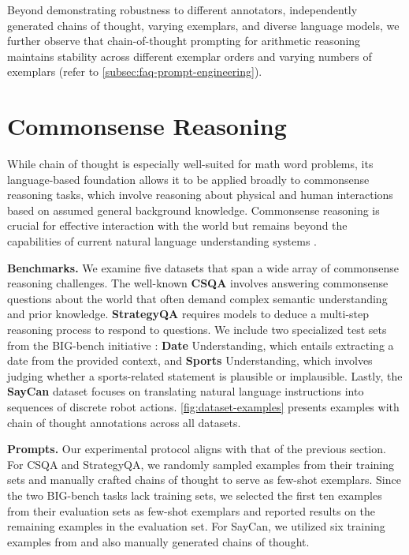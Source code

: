Beyond demonstrating robustness to different annotators, independently generated chains of thought, varying exemplars, and diverse language models, we further observe that chain-of-thought prompting for arithmetic reasoning maintains stability across different exemplar orders and varying numbers of exemplars (refer to \cref{subsec:faq-prompt-engineering}).

\section{Commonsense Reasoning}\label{sec:commonsense-reasoning}

While chain of thought is especially well-suited for math word problems, its language-based foundation allows it to be applied broadly to commonsense reasoning tasks, which involve reasoning about physical and human interactions based on assumed general background knowledge. Commonsense reasoning is crucial for effective interaction with the world but remains beyond the capabilities of current natural language understanding systems \citep{talmor2022commonsenseqa}.

\textbf{Benchmarks.}  
We examine five datasets that span a wide array of commonsense reasoning challenges. The well-known \textbf{CSQA} \citep{talmor-etal-2019-commonsenseqa} involves answering commonsense questions about the world that often demand complex semantic understanding and prior knowledge.  
\textbf{StrategyQA} \citep{geva-etal-2021-aristotle} requires models to deduce a multi-step reasoning process to respond to questions. We include two specialized test sets from the BIG-bench initiative \citep{bigbench}: \textbf{Date} Understanding, which entails extracting a date from the provided context, and \textbf{Sports} Understanding, which involves judging whether a sports-related statement is plausible or implausible. Lastly, the \textbf{SayCan} dataset \citep{ahn2022can} focuses on translating natural language instructions into sequences of discrete robot actions.  
\cref{fig:dataset-examples} presents examples with chain of thought annotations across all datasets.

\textbf{Prompts.}  
Our experimental protocol aligns with that of the previous section. For CSQA and StrategyQA, we randomly sampled examples from their training sets and manually crafted chains of thought to serve as few-shot exemplars. Since the two BIG-bench tasks lack training sets, we selected the first ten examples from their evaluation sets as few-shot exemplars and reported results on the remaining examples in the evaluation set. For SayCan, we utilized six training examples from \citet{ahn2022can} and also manually generated chains of thought.

